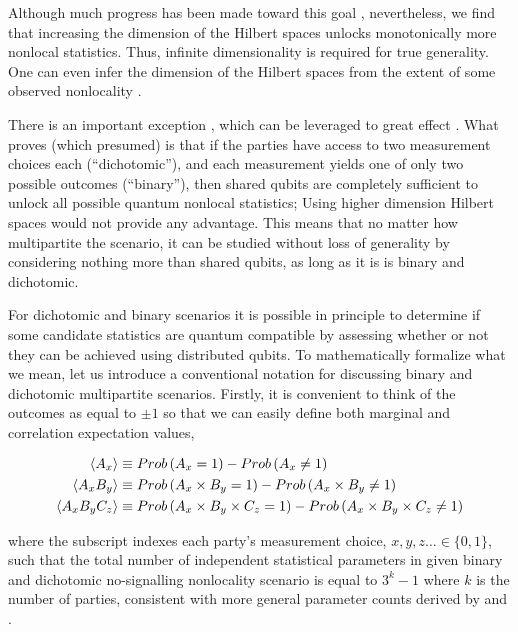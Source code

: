 \documentclass[
  12pt          %
  ,letterpaper  %
  ,center       %
  ,noupper      %
  ,english,fleqn]{uconnthesis}
\newcommand{\brackets}[1]{\lbrace{#1\rbrace}}
\newcommand{\LeftEqns}[1]{\begin{fleqn}[\leftmargini minus \leftmargini]\begin{align}#1\end{align}\end{fleqn}}
\newcommand{\LeftEqn}[1]{\LeftEqns{\begin{split}#1\end{split}}}
\begin{document}
    Although much progress has been made toward this goal \cite{MixedStateQB,WernerWolfQB,MinMaxQB,WehnerQB,VerstraeteBellMonogamy}, nevertheless, we find that increasing the dimension of the Hilbert spaces unlocks monotonically more nonlocal statistics. Thus, infinite dimensionality is required for true generality. One can even infer the dimension of the Hilbert spaces from the extent of some observed nonlocality \cite{Dimension2008,Dimension2010,Dimension2013,Dimension2013Cabello,Dimension2014Cabello}. 
    
    There is an important exception \cite{MasanesQubits}, which can be leveraged to great effect \cite{WolfeQB}. What \citet{MasanesQubits} proves (which \citet{Tsirelson1980} presumed) is that if the parties have access to two measurement choices each (``dichotomic''), and each measurement yields one of only two possible outcomes (``binary''), then shared qubits are completely sufficient to unlock all possible quantum nonlocal statistics; Using higher dimension Hilbert spaces would not provide any advantage. This means that no matter how multipartite the scenario, it can be studied without loss of generality by considering nothing more than shared qubits, as long as it is is binary and dichotomic. 
    
    
    For dichotomic and binary scenarios it is possible in principle to determine if some candidate statistics are quantum compatible by assessing whether or not they can be achieved using distributed qubits. To mathematically formalize what we mean, let us introduce a conventional notation for discussing binary and dichotomic multipartite scenarios. Firstly, it is convenient to think of the outcomes as equal to $\pm 1$ so that we can easily define both marginal and correlation expectation values,
\LeftEqn{\label{eq:expectoprobs}
    \Braket{A_x} &\equiv Prob\left(A_x=1\right)-Prob\left(A_x \neq 1 \right) \\
    \Braket{A_x B_y} &\equiv Prob\left(A_x \times B_y = 1\right)-Prob\left(A_x \times B_y \neq 1\right)  \\
    \Braket{A_x B_y C_z} &\equiv Prob\left(A_x\times B_y \times C_z = 1\right)-Prob\left(A_x\times B_y \times C_z \neq 1\right) 
}
where the subscript indexes each party's measurement choice, $x,y,z\dotsc\in\brackets{0,1}$, such that the total number of independent statistical parameters in given binary and dichotomic no-signalling nonlocality scenario is equal to $3^k-1$ where $k$ is the number of parties, consistent with more general parameter counts derived by \citet[Eqn. (9)]{PironioDimension} and \citet[Eqn. (8)]{Brunner2013Bell}.
\end{document}
